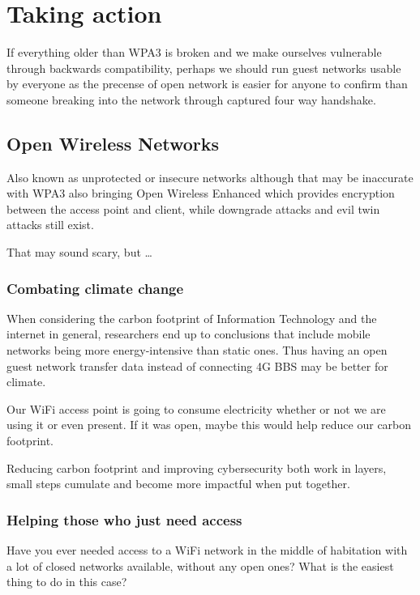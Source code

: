 \documentclass[../wifi-security.tex]{subfiles}
\begin{document}
\chapter{Taking action}

If everything older than WPA3 is broken and we make ourselves vulnerable through backwards compatibility, perhaps we should run guest networks usable by everyone as the precense of open network is easier for anyone to confirm than someone breaking into the network through captured four way handshake.

\section{Open Wireless Networks}

Also known as unprotected or insecure networks although that may be inaccurate with WPA3 also bringing Open Wireless Enhanced which provides encryption between the access point and client, while downgrade attacks and evil twin attacks still exist.

That may sound scary, but \dots

\subsection{Combating climate change}


When considering the carbon footprint of Information Technology and the internet in general, researchers end up to conclusions that include mobile networks being more energy-intensive than static ones. Thus having an open guest network transfer data instead of connecting 4G BBS may be better for climate.

Our WiFi access point is going to consume electricity whether or not we are using it or even present. If it was open, maybe this would help reduce our carbon footprint.

Reducing carbon footprint and improving cybersecurity both work in layers, small steps cumulate and become more impactful when put together.

\subsection{Helping those who just need access}

Have you ever needed access to a WiFi network in the middle of habitation with a lot of closed networks available, without any open ones? What is the easiest thing to do in this case?
\end{document}
